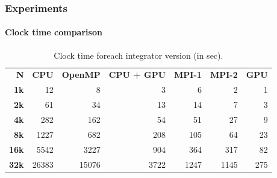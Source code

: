 \begin{frame}
    \frametitle{Experiments}
    \framesubtitle{Clock time comparison}

\begin{table}[H]
    \centering
    \footnotesize
    \begin{tabular}{rrrrrrr}
        \hline
        {\bf N} & \multicolumn{1}{c}{\bf CPU}
                & \multicolumn{1}{c}{\bf OpenMP}
                & \multicolumn{1}{c}{\bf CPU + GPU}
                & \multicolumn{1}{c}{\bf MPI-1}
                & \multicolumn{1}{c}{\bf MPI-2}
                & \multicolumn{1}{c}{\bf GPU}   \\
         {\bf  1k} &    12 &     8  &    3      &    6  &    2 &    1          \\
         {\bf  2k} &    61 &    34  &   13      &   14  &    7 &    3          \\
         {\bf  4k} &   282 &   162  &   54      &   51  &   27 &    9          \\
         {\bf  8k} &  1227 &   682  &  208      &  105  &   64 &   23          \\
         {\bf 16k} &  5542 &  3227  &  904      &  364  &  317 &   82          \\
         {\bf 32k} & 26383 & 15076  & 3722      & 1247  & 1145 &  275          \\ \hline
    \end{tabular}
    \caption{Clock time foreach integrator version (in sec).}
    \label{tab:acc}
\end{table}

\end{frame}

